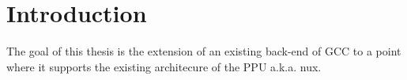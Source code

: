 \chapter{Introduction}
\label{chapter:introduction}

The goal of this thesis is the extension of an existing back-end of GCC to a point where it supports the existing architecure of the PPU a.k.a. nux.


